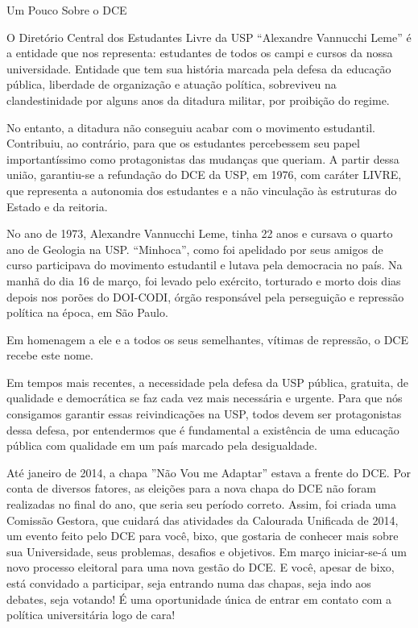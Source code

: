 \begin{secao}{Um Pouco Sobre o DCE}

O Diretório Central dos Estudantes Livre da USP ``Alexandre Vannucchi Leme'' é a
entidade que nos representa: estudantes de todos os campi e cursos da nossa universidade.
Entidade que tem sua história marcada pela defesa da educação pública, liberdade
de organização e atuação política, sobreviveu na clandestinidade por alguns anos
da ditadura militar, por proibição do regime.

No entanto, a ditadura não conseguiu acabar com o movimento estudantil. Contribuiu,
ao contrário, para que os estudantes percebessem seu papel importantíssimo como
protagonistas das mudanças que queriam. A partir dessa união, garantiu-se a
refundação do DCE da USP, em 1976, com caráter LIVRE, que representa a autonomia
dos estudantes e a não vinculação às estruturas do Estado e da reitoria.

No ano de 1973, Alexandre Vannucchi Leme, tinha 22 anos e cursava o quarto ano
de Geologia na USP. ``Minhoca'', como foi apelidado por seus amigos de curso participava
do movimento estudantil e lutava pela democracia no país. Na manhã do dia 16 de março,
foi levado pelo exército, torturado e morto dois dias depois nos porões do DOI-CODI,
órgão responsável pela perseguição e repressão política na época, em São Paulo.

Em homenagem a ele e a todos os seus semelhantes, vítimas de repressão, o DCE recebe este nome.

Em tempos mais recentes, a necessidade pela defesa da USP pública, gratuita, de qualidade
e democrática se faz cada vez mais necessária e urgente. Para que nós consigamos
garantir essas reivindicações na USP, todos devem ser protagonistas dessa defesa,
por entendermos que é fundamental a existência de uma educação pública com qualidade
em um país marcado pela desigualdade.

Até janeiro de 2014, a chapa ''Não Vou me Adaptar'' estava a frente do DCE. Por conta de diversos
fatores, as eleições para a nova chapa do DCE não foram realizadas no final do ano, que seria seu período correto.
Assim, foi criada uma Comissão Gestora, que cuidará das atividades da Calourada Unificada de 2014, um evento feito pelo
DCE para você, bixo, que gostaria de conhecer mais sobre sua Universidade, seus problemas, desafios
e objetivos. Em março iniciar-se-á um novo processo eleitoral para uma nova gestão do DCE. E você, apesar
de bixo, está convidado a participar, seja entrando numa das chapas, seja indo aos debates, seja votando!
É uma oportunidade única de entrar em contato com a política universitária logo de cara!


\end{secao}
